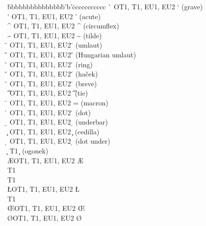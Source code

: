 \begin{tabbing}
\ttverb\textvisiblespace\quad\=bbbbbbbbbbbbbb\=b'b'\=ccccccccccc\kill
\ttverb\`{}               \>OT1, T1, EU1, EU2\>   \a`{}\> (grave)      \\
\ttverb\'{}               \>OT1, T1, EU1, EU2\>   \a'{}\> (acute)      \\
\ttverb\^{}               \>OT1, T1, EU1, EU2\>   \^{}\>  (circumflex) \\
\ttverb\~{}               \>OT1, T1, EU1, EU2\>   \~{}\>  (tilde)      \\
\ttverb\"{}               \>OT1, T1, EU1, EU2\>   \"{}\>  (umlaut)     \\
\ttverb\H{}               \>OT1, T1, EU1, EU2\>   \H{}\>  (Hungarian umlaut) \\
\ttverb\r{}               \>OT1, T1, EU1, EU2\>   \r{}\>  (ring)       \\
\ttverb\v{}               \>OT1, T1, EU1, EU2\>   \v{}\>  (ha\v{c}ek)  \\
\ttverb\u{}               \>OT1, T1, EU1, EU2\>   \u{}\>  (breve)      \\
\ttverb\t{}               \>OT1, T1, EU1, EU2\>   \t{}\>  (tie)        \\
\ttverb\={}               \>OT1, T1, EU1, EU2\>   \a={}\> (macron)     \\
\ttverb\.{}               \>OT1, T1, EU1, EU2\>   \.{}\>  (dot)        \\
\ttverb\b{}               \>OT1, T1, EU1, EU2\>   \b{}\>  (underbar)   \\
\ttverb\c{}               \>OT1, T1, EU1, EU2\>   \c{}\>  (cedilla)    \\
\ttverb\d{}               \>OT1, T1, EU1, EU2\>   \d{}\>  (dot under)  \\
\ttverb\k{}               \>T1    \>   \k{}\>  (ogonek)     \\
\ttverb\AE                \>OT1, T1, EU1, EU2\>   \AE \>               \\
\ttverb\DH                \>T1    \>   \DH \>               \\
\ttverb\DJ                \>T1    \>   \DJ \>               \\
\ttverb\L                 \>OT1, T1, EU1, EU2\>   \L  \>               \\
\ttverb\NG                \>T1    \>   \NG \>               \\
\ttverb\OE                \>OT1, T1, EU1, EU2\>   \OE \>               \\
\ttverb\O                 \>OT1, T1, EU1, EU2\>   \O  \>               \\

\end{tabbing}
